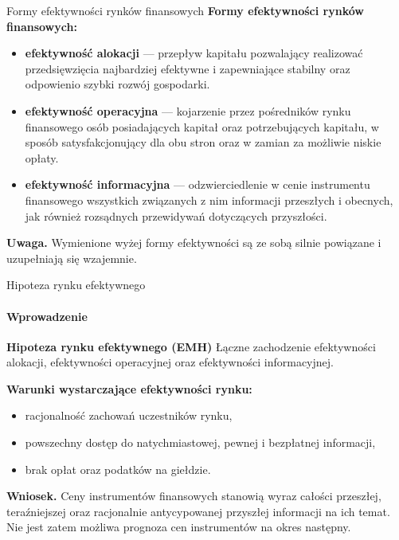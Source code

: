 \documentclass[a4paper, 11pt]{beamer}
\begin{document}
	\begin{frame}{Formy efektywności rynków finansowych}
		\textbf{Formy efektywności rynków finansowych:}
		\begin{itemize}
			\item \textbf{efektywność alokacji} --- przepływ kapitału pozwalający realizować
				przedsięwzięcia najbardziej efektywne i zapewniające stabilny oraz odpowienio szybki
				rozwój gospodarki.
			\item \textbf{efektywność operacyjna} --- kojarzenie przez pośredników rynku finansowego
				osób posiadających kapitał oraz potrzebujących kapitału, w sposób satysfakcjonujący dla
				obu stron oraz w zamian za możliwie niskie opłaty.
			\item \textbf{efektywność informacyjna} --- odzwierciedlenie w cenie instrumentu finansowego
				wszystkich związanych z nim informacji przeszłych i obecnych, jak również rozsądnych
				przewidywań dotyczących przyszłości.
		\end{itemize}
		\begin{alert}{\textbf{Uwaga.}}
			Wymienione wyżej formy efektywności są ze sobą silnie powiązane i uzupełniają się wzajemnie.
		\end{alert}
	\end{frame}
	
	\begin{frame}{Hipoteza rynku efektywnego}
		\framesubtitle{Wprowadzenie}
		\begin{block}{\textbf{Hipoteza rynku efektywnego (EMH)}}
			Łączne zachodzenie efektywności alokacji, efektywności operacyjnej oraz efektywności informacyjnej.
		\end{block}
		\textbf{Warunki wystarczające efektywności rynku:}
		\begin{itemize}
			\item racjonalność zachowań uczestników rynku,
			\item powszechny dostęp do natychmiastowej, pewnej i bezpłatnej informacji,
			\item brak opłat oraz podatków na giełdzie.
		\end{itemize}
		\begin{alert}{\textbf{Wniosek.}}
			Ceny instrumentów finansowych stanowią wyraz całości przeszłej, teraźniejszej oraz racjonalnie
			antycypowanej przyszłej informacji na ich temat. Nie jest zatem możliwa prognoza cen instrumentów
			na okres następny.
		\end{alert}
	\end{frame}
	
\end{document}
